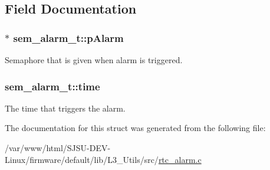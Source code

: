 \subsection{Field Documentation}
\subsubsection[{\texorpdfstring{p\+Alarm}{pAlarm}}]{$\ast$ sem\+\_\+alarm\+\_\+t\+::p\+Alarm}\hypertarget{structsem__alarm__t_a54659f23e4bda0165833ae8b2f3eb59e}{}\label{structsem__alarm__t_a54659f23e4bda0165833ae8b2f3eb59e}


Semaphore that is given when alarm is triggered. 

\subsubsection[{\texorpdfstring{time}{time}}]{ sem\+\_\+alarm\+\_\+t\+::time}\hypertarget{structsem__alarm__t_a3b87d17465b7f8609af56a748366558e}{}\label{structsem__alarm__t_a3b87d17465b7f8609af56a748366558e}


The time that triggers the alarm. 



The documentation for this struct was generated from the following file\+:\begin{DoxyCompactItemize}
\item 
/var/www/html/\+S\+J\+S\+U-\/\+D\+E\+V-\/\+Linux/firmware/default/lib/\+L3\+\_\+\+Utils/src/\hyperlink{rtc__alarm_8c}{rtc\+\_\+alarm.\+c}\end{DoxyCompactItemize}
